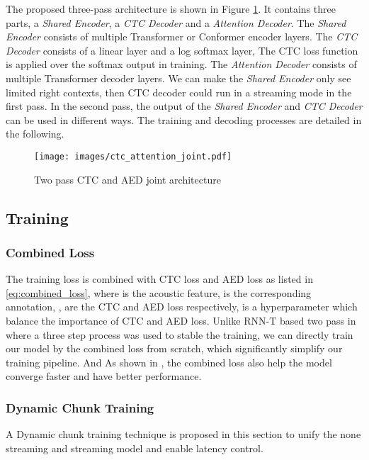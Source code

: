 \documentclass[a4paper]{article}
\begin{document}
The proposed three-pass architecture is shown in Figure \ref{fig:ctc_attention_joint}. It contains three parts, a \textit{Shared Encoder}, a \textit{CTC Decoder} and a \textit{Attention Decoder}. The \textit{Shared Encoder} consists of multiple Transformer\cite{vaswani2017attention} or Conformer\cite{gulati2020conformer} encoder layers. The \textit{CTC Decoder} consists of a linear layer and a log softmax layer, The CTC loss function is applied over the softmax output in training. The \textit{Attention Decoder} consists of multiple Transformer decoder layers. We can make the \textit{Shared Encoder} only see limited right contexts, then CTC decoder could run in a streaming mode in the first pass. In the second pass, the output of the \textit{Shared Encoder} and \textit{CTC Decoder} can be used in different ways. The training and decoding processes are detailed in the following.
\begin{figure}[h]
  \centering
  \texttt{[image: images/ctc\_attention\_joint.pdf]}
  \caption{Two pass CTC and AED joint architecture}
  \label{fig:ctc_attention_joint}
  \vspace{-1.5em}
\end{figure}
\subsection{Training}
\subsubsection{Combined Loss}

The training loss is combined with CTC loss and AED loss as listed in  \ref{eq:combined_loss}, where  is the acoustic feature,  is the corresponding annotation, ,
 are the CTC and AED loss respectively,
 is a hyperparameter which balance the importance of CTC and AED loss. Unlike RNN-T based two pass in \cite{sainath2019two} where a three step process was used to stable the training, we can directly train our model by the combined loss from scratch, which significantly simplify our training pipeline. And As shown in \cite{kim2017joint}, the combined loss also help the model converge faster and have better performance.


\subsubsection{Dynamic Chunk Training}

A Dynamic chunk training technique is proposed in this section to unify the none streaming and streaming model and enable latency control. 
\end{document}
